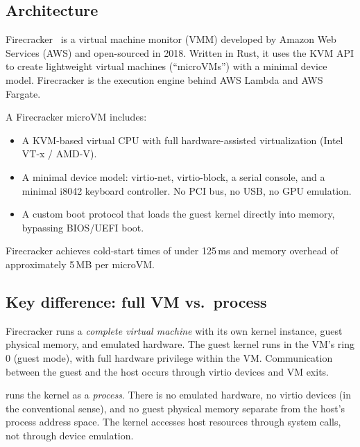 \subsection{Architecture}

Firecracker~\cite{agache2020,firecracker} is a virtual machine monitor
(VMM) developed by Amazon Web Services (AWS) and open-sourced in 2018.
Written in Rust, it uses the KVM API to create lightweight virtual
machines (``microVMs'') with a minimal device model.  Firecracker is
the execution engine behind AWS Lambda and AWS Fargate.

A Firecracker microVM includes:

\begin{itemize}[leftmargin=2em]
  \item A KVM-based virtual CPU with full hardware-assisted
        virtualization (Intel VT-x / AMD-V).
  \item A minimal device model: virtio-net, virtio-block, a serial
        console, and a minimal i8042 keyboard controller.  No PCI bus,
        no USB, no GPU emulation.
  \item A custom boot protocol that loads the guest kernel directly
        into memory, bypassing BIOS/UEFI boot.
\end{itemize}

Firecracker achieves cold-start times of under 125\,ms and memory
overhead of approximately 5\,MB per microVM.

\subsection{Key difference: full VM vs.\ process}

Firecracker runs a \emph{complete virtual machine} with its own kernel
instance, guest physical memory, and emulated hardware.  The guest kernel
runs in the VM's ring 0 (guest mode), with full hardware privilege within
the VM.  Communication between the guest and the host occurs through
virtio devices and VM exits.

\UML{} runs the kernel as a \emph{process}.  There is no emulated hardware,
no virtio devices (in the conventional sense), and no guest physical memory
separate from the host's process address space.  The \UML{} kernel
accesses host resources through system calls, not through device emulation.


